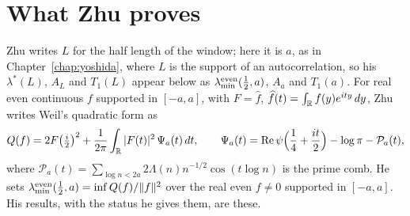 \section{What Zhu proves}\label{zh:sec:zhu}

Zhu \cite{Zhu26} writes $L$ for the half length of the window; here it is $a$, as in Chapter~\ref{chap:yoshida}, where $L$ is the support of an autocorrelation, so his $\lambda^*(L)$, $A_L$ and $T_1(L)$ appear below as $\lambda^{\rm even}_{\min}(\frac12,a)$, $A_a$ and $T_1(a)$. For real even continuous $f$ supported in $[-a,a]$, with $F=\widehat f$, $\widehat f(t)=\int_{\mathbb{R}} f(y)e^{ity}\,dy$, Zhu writes Weil's quadratic form as
\begin{equation}\label{zh:Q}
Q(f)=2F\bigl(\tfrac i2\bigr)^2+\frac1{2\pi}\int_{\mathbb{R}}|F(t)|^2\,\Psi_a(t)\,dt,\qquad
\Psi_a(t)=\operatorname{Re}\psi\Bigl(\frac14+\frac{it}2\Bigr)-\log\pi-\mathcal P_a(t),
\end{equation}
where $\mathcal P_a(t)=\sum_{\log n<2a}2\Lambda(n)n^{-1/2}\cos(t\log n)$ is the prime comb. He sets $\lambda^{\rm even}_{\min}(\frac12,a)=\inf Q(f)/\|f\|^2$ over the real even $f\ne0$ supported in $[-a,a]$. His results, with the status he gives them, are these.
